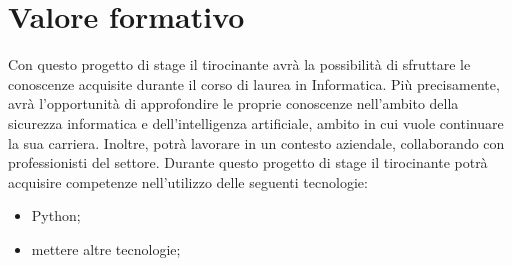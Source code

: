 \section{Valore formativo}
Con questo progetto di stage il tirocinante avrà la possibilità di sfruttare le conoscenze acquisite durante il corso di laurea in Informatica. Più precisamente, avrà l'opportunità di approfondire le proprie conoscenze nell'ambito della sicurezza informatica e dell'intelligenza artificiale, ambito in cui vuole continuare la sua carriera. Inoltre, potrà lavorare in un contesto aziendale, collaborando con professionisti del settore. Durante questo progetto di stage il tirocinante potrà acquisire competenze nell'utilizzo delle seguenti tecnologie:
\begin{itemize}
  \item Python;
  \item mettere altre tecnologie;
\end{itemize}

